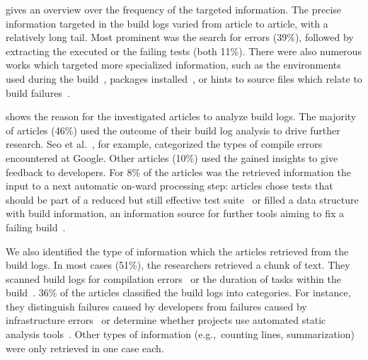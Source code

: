  gives an overview over the frequency of
the targeted information.
The precise information targeted in the build logs varied from article
to article, with a relatively long tail.
Most prominent was the search for errors (39\%), followed by extracting
the executed or the failing
tests (both 11\%).
There were also numerous works which targeted more specialized
information, such as the environments used during the
build~\cite{zolfagharinia2017not}, packages
installed~\cite{selberg2012use}, or hints to source files which
relate to build failures~\cite{ren2018automated}.

 shows the reason for the
investigated articles to analyze build logs.
The majority of articles (46\%) used the outcome of their build log
analysis to drive further research.
Seo et al.~\cite{seo2014programmers}, for example,
categorized the types of compile errors encountered at
Google.
Other articles (10\%) used the gained insights to give feedback to
developers.
For 8\% of the articles was the retrieved information the input
to a next automatic on-ward processing step:
articles chose
tests that should be part of a reduced but still effective test
suite~\cite{shi2018evaluating} or filled a data structure with
build information, an information source for further tools aiming
to fix a failing build~\cite{vassallo2018un-break}.

We also identified the type of information which the articles
retrieved from the build logs.
In most cases (51\%), the researchers retrieved a chunk of text.
They scanned build logs for compilation
errors~\cite{clemencic2014new} or
the duration of tasks within the build~\cite{zhang2016android}.
36\% of the articles classified the build logs into categories.
For instance, they distinguish failures caused by developers from
failures caused
by infrastructure errors~\cite{lindqvist2019detection} or
determine whether projects use automated static analysis
tools~\cite{kavaler2019tool}.
Other types of information (e.g.,\ counting
lines, summarization) were only retrieved
in one case each.

